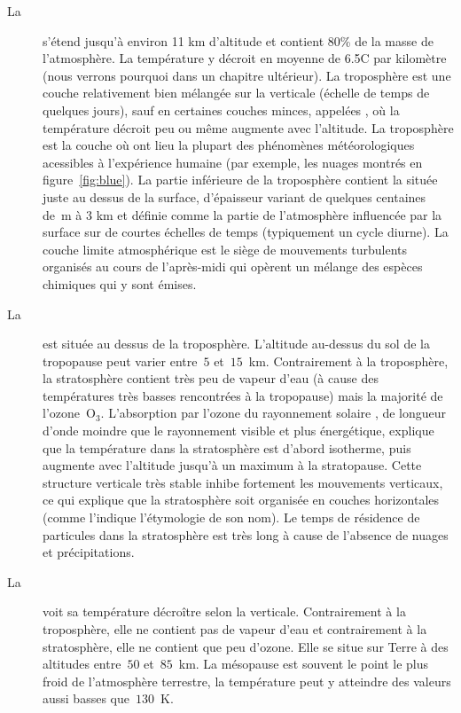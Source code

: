 \sk
\begin{description} 
\item[La ] s'étend jusqu'à environ 11 km d'altitude et contient 80\% de la masse de l'atmosphère. La température y décroit en moyenne de 6.5\deg C par kilomètre (nous verrons pourquoi dans un chapitre ultérieur). La troposphère est une couche relativement bien mélangée sur la verticale (échelle de temps de quelques jours), sauf en certaines couches minces, appelées , où la température décroit peu ou même augmente avec l'altitude. La troposphère est la couche où ont lieu la plupart des phénomènes météorologiques acessibles à l'expérience humaine (par exemple, les nuages montrés en figure~\ref{fig:blue}). La partie inférieure de la troposphère contient la  située juste au dessus de la surface, d'épaisseur variant de quelques centaines de~m à 3 km et définie comme la partie de l'atmosphère influencée par la surface sur de courtes échelles de temps (typiquement un cycle diurne). La couche limite atmosphérique est le siège de mouvements turbulents organisés au cours de l'après-midi qui opèrent un mélange des espèces chimiques qui y sont émises.
\item[La ] est située au dessus de la troposphère. L'altitude au-dessus du sol de la tropopause peut varier entre~$5$ et~$15$~km. Contrairement à la troposphère, la stratosphère contient très peu de vapeur d'eau (à cause des températures très basses rencontrées à la tropopause) mais la majorité de l'ozone~O$_3$. L'absorption par l'ozone du rayonnement solaire , de longueur d'onde moindre que le rayonnement visible et plus énergétique, explique que la température dans la stratosphère est d'abord isotherme, puis augmente avec l'altitude jusqu'à un maximum à la stratopause. Cette structure verticale très stable inhibe fortement les mouvements verticaux, ce qui explique que la stratosphère soit organisée en couches horizontales (comme l'indique l'étymologie de son nom). Le temps de résidence de particules dans la stratosphère est très long à cause de l'absence de nuages et précipitations.
\item[La ] voit sa température décroître selon la verticale. Contrairement à la troposphère, elle ne contient pas de vapeur d'eau et contrairement à la stratosphère, elle ne contient que peu d'ozone. Elle se situe sur Terre à des altitudes entre~$50$ et~$85$~km. La mésopause est souvent le point le plus froid de l'atmosphère terrestre, la température peut y atteindre des valeurs aussi basses que~$130$~K. 

\end{description}
